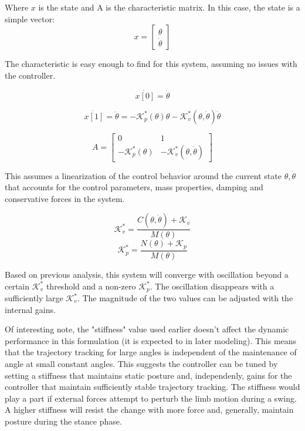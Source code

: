 \documentclass[12pt, letterpaper, oneside, notitlepage, onecolumn]{article}
\begin{document}
Where $x$ is the state and A is the characteristic matrix. In this case, the
state is a simple vector:
\begin{equation}
x =
\begin{bmatrix}
\theta \\
\dot{\theta}
\end{bmatrix}
\end{equation}

The characteristic is easy enough to find for this system, assuming no issues
with the controller.

\begin{equation}
\dot{x[0]} = \dot{\theta}
\end{equation}

\begin{equation}
\dot{x[1]}
=
\ddot{\theta}
=
-\mathcal{K}_{p}^{*}(\theta) \theta 
- \mathcal{K}_{v}^{*}(\theta, \dot{\theta}) \dot{\theta}
\end{equation}

\begin{equation}
A =
\begin{bmatrix}
0 & 1 \\
-\mathcal{K}_{p}^{*}(\theta) & - \mathcal{K}_{v}^{*}(\theta, \dot{\theta})
\end{bmatrix}
\end{equation}

This assumes a linearization of the control behavior around the current state
$\theta, \dot{\theta}$ that accounts for the control parameters, mass
properties, damping and conservative forces in the system.

\begin{equation}
\mathcal{K}_{v}^{*}
= 
\dfrac{C(\theta, \dot{\theta})
+ \mathcal{K}_{v}}{M(\theta)}
\end{equation}
\begin{equation}
\mathcal{K}_{p}^{*}
=
\dfrac{N(\theta) + \mathcal{K}_{p}}{M(\theta)}
\end{equation}

Based on previous analysis, this system will converge with oscillation beyond a
certain $\mathcal{K}_{v}^{*}$ threshold and a non-zero $\mathcal{K}_{p}^{*}$. The
oscillation disappears with a sufficiently large $\mathcal{K}_{v}^{*}$. The
magnitude of the two values can be adjusted with the internal gains.

Of interesting note, the "stiffness" value used earlier doesn't affect the
dynamic performance in this formulation (it is expected to in later modeling).
This means that the trajectory tracking for large angles is independent of the
maintenance of angle at small constant angles. This suggests the controller can
be tuned by setting a stiffness that maintains static posture and,
independenly, gains for the controller that maintain sufficiently stable
trajectory tracking. The stiffness would play a part if external forces attempt
to perturb the limb motion during a swing. A higher stiffness will resist the
change with more force and, generally, maintain posture during the stance phase.
\end{document}
